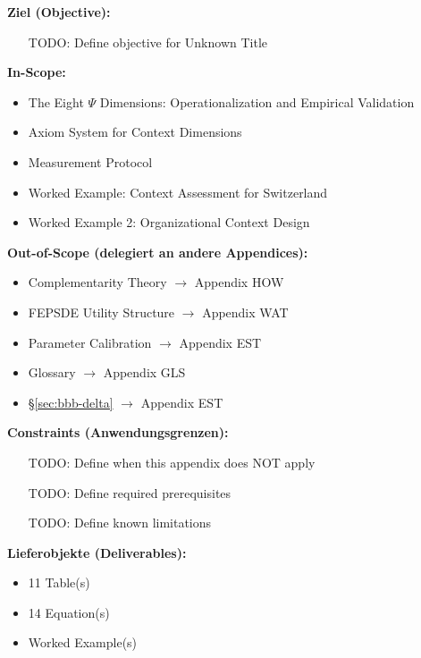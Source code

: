 
\begin{tcolorbox}[
    colback=orange!5!white,
    colframe=orange!75!black,
    title={\textbf{Appendix Scope: Ziel / In-Scope / Out-of-Scope / Constraints}},
    fonttitle=\bfseries
]

\textbf{Ziel (Objective):}
\begin{itemize}[nosep]
    \item [TODO: Define objective for Unknown Title]
\end{itemize}

\textbf{In-Scope:}
\begin{itemize}[nosep]
    \item The Eight $\Psi$ Dimensions: Operationalization and Empirical Validation
    \item Axiom System for Context Dimensions
    \item Measurement Protocol
    \item Worked Example: Context Assessment for Switzerland
    \item Worked Example 2: Organizational Context Design
\end{itemize}

\textbf{Out-of-Scope (delegiert an andere Appendices):}
\begin{itemize}[nosep]
    \item Complementarity Theory $\rightarrow$ Appendix HOW
    \item FEPSDE Utility Structure $\rightarrow$ Appendix WAT
    \item Parameter Calibration $\rightarrow$ Appendix EST
    \item Glossary $\rightarrow$ Appendix GLS
    \item \S\ref{sec:bbb-delta} $\rightarrow$ Appendix EST
\end{itemize}

\textbf{Constraints (Anwendungsgrenzen):}
\begin{itemize}[nosep]
    \item [TODO: Define when this appendix does NOT apply]
    \item [TODO: Define required prerequisites]
    \item [TODO: Define known limitations]
\end{itemize}

\textbf{Lieferobjekte (Deliverables):}
\begin{itemize}[nosep]
    \item 11 Table(s)
    \item 14 Equation(s)
    \item Worked Example(s)
\end{itemize}

\end{tcolorbox}


